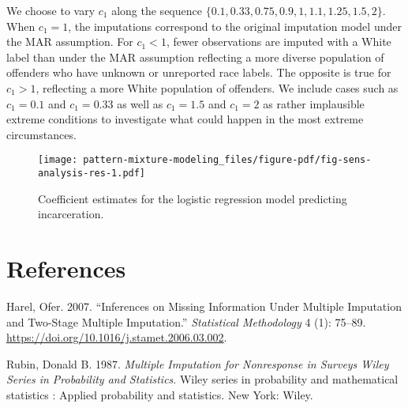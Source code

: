 \documentclass[
  letterpaper,
  DIV=11,
  numbers=noendperiod]{scrartcl}
\newlength{\cslhangindent}
\newlength{\cslentryspacingunit} %
\newenvironment{CSLReferences}[2] %
 {%
  \setlength{\parindent}{0pt}
  \ifodd #1
  \let\oldpar\par
  \def\par{\hangindent=\cslhangindent\oldpar}
  \fi
  \setlength{\parskip}{#2\cslentryspacingunit}
 }%
 {}
\begin{document}
We choose to vary \(c_1\) along the sequence
\(\{0.1, 0.33, 0.75, 0.9, 1, 1.1, 1.25, 1.5, 2\}.\) When \(c_1 = 1\),
the imputations correspond to the original imputation model under the
MAR assumption. For \(c_1 < 1\), fewer observations are imputed with a
White label than under the MAR assumption reflecting a more diverse
population of offenders who have unknown or unreported race labels. The
opposite is true for \(c_1 > 1\), reflecting a more White population of
offenders. We include cases such as \(c_1 = 0.1\) and \(c_1 = 0.33\) as
well as \(c_1 = 1.5\) and \(c_1 = 2\) as rather implausible extreme
conditions to investigate what could happen in the most extreme
circumstances.

\begin{figure}

{\centering \texttt{[image: pattern-mixture-modeling\_files/figure-pdf/fig-sens-analysis-res-1.pdf]}

}

\caption{\label{fig-sens-analysis-res}Coefficient estimates for the
logistic regression model predicting incarceration.}

\end{figure}

\newpage

\hypertarget{references}{%
\section*{References}\label{references}}

\hypertarget{refs}{}
\begin{CSLReferences}{1}{0}
\leavevmode{}%
Harel, Ofer. 2007. {``Inferences on Missing Information Under Multiple
Imputation and Two-Stage Multiple Imputation.''} \emph{Statistical
Methodology} 4 (1): 75--89.
\url{https://doi.org/10.1016/j.stamet.2006.03.002}.

\leavevmode{}%
Rubin, Donald B. 1987. \emph{{Multiple Imputation for Nonresponse in
Surveys \textbar{} Wiley Series in Probability and Statistics}}. {Wiley
series in probability and mathematical statistics : Applied probability
and statistics}. {New York}: {Wiley}.

\end{CSLReferences}
\end{document}
